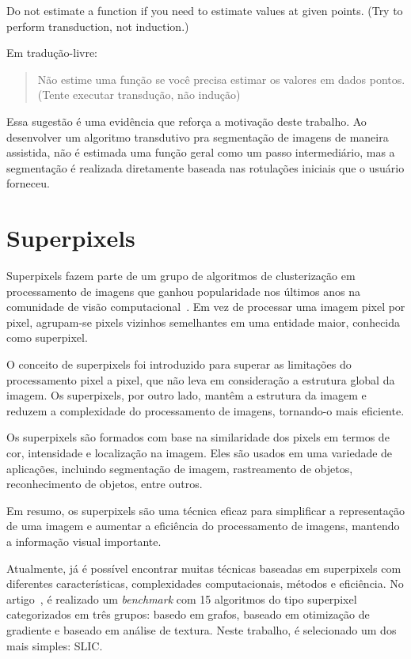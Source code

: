 \begin{displayquote}

  Do not estimate a function if you need to estimate values at given
  points. (Try to perform transduction, not induction.)

\end{displayquote}

Em tradução-livre: \blockquote{Não estime uma função se você precisa estimar
os valores em dados pontos. (Tente executar transdução, não
indução)}. Essa sugestão é uma evidência que reforça a motivação
deste trabalho. Ao desenvolver um algoritmo transdutivo pra
segmentação de imagens de maneira assistida, não é estimada uma função
geral como um passo intermediário, mas a segmentação é realizada
diretamente baseada nas rotulações iniciais que o usuário forneceu.


\section{Superpixels}\label{sec:teorica-superpixel}

Superpixels fazem parte de um grupo de algoritmos de clusterização em
processamento de imagens que ganhou popularidade nos últimos anos na
comunidade de visão computacional~\cite{SuperpixelSurvey2020}. Em vez
de processar uma imagem pixel por pixel, agrupam-se pixels vizinhos
semelhantes em uma entidade maior, conhecida como superpixel.

O conceito de superpixels foi introduzido para superar as limitações
do processamento pixel a pixel, que não leva em consideração a
estrutura global da imagem. Os superpixels, por outro lado, mantêm a
estrutura da imagem e reduzem a complexidade do processamento de
imagens, tornando-o mais eficiente.

Os superpixels são formados com base na similaridade dos pixels em
termos de cor, intensidade e localização na imagem. Eles são usados em
uma variedade de aplicações, incluindo segmentação de imagem,
rastreamento de objetos, reconhecimento de objetos, entre outros.

Em resumo, os superpixels são uma técnica eficaz para simplificar a
representação de uma imagem e aumentar a eficiência do processamento
de imagens, mantendo a informação visual importante.

Atualmente, já é possível encontrar muitas técnicas baseadas em
superpixels com diferentes características, complexidades
computacionais, métodos e eficiência. No
artigo~\cite{SuperPixelBenchmark2017}, é realizado um \textit{benchmark} com 15
algoritmos do tipo superpixel categorizados em três grupos: basedo em grafos,
baseado em otimização de gradiente e baseado em análise de
textura. Neste trabalho, é selecionado um dos mais simples: \gls{SLIC}.

